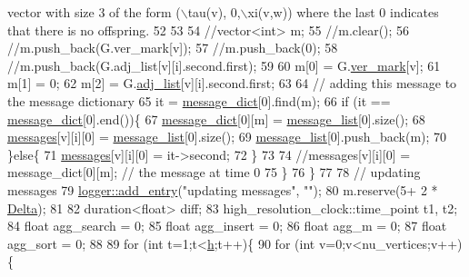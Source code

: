 \begin{DoxyCode}
{       vector with size 3 of the form (\(\backslash\)tau(v), 0,\(\backslash\)xi(v,w)) where the last 0 indicates that there is no offspring.}
52 
53 
54       \textcolor{comment}{//vector<int> m;}
55       \textcolor{comment}{//m.clear();}
56       \textcolor{comment}{//m.push\_back(G.ver\_mark[v]);}
57       \textcolor{comment}{//m.push\_back(0);}
58       \textcolor{comment}{//m.push\_back(G.adj\_list[v][i].second.first);}
59 
60       m[0] = G.\hyperlink{classmarked__graph_ac83e9377dd4d8bb95be1ac949b127296}{ver\_mark}[v];
61       m[1] = 0;
62       m[2] = G.\hyperlink{classmarked__graph_a1a0bf7ca413a278763f7c878b3b6fd6f}{adj\_list}[v][i].second.first;
63 
64       \textcolor{comment}{// adding this message to the message dictionary}
65       it = \hyperlink{classgraph__message_ab54d89b122c2b1322da0d5db2043fb84}{message\_dict}[0].find(m); 
66       \textcolor{keywordflow}{if} (it == \hyperlink{classgraph__message_ab54d89b122c2b1322da0d5db2043fb84}{message\_dict}[0].end())\{
67         \hyperlink{classgraph__message_ab54d89b122c2b1322da0d5db2043fb84}{message\_dict}[0][m] = \hyperlink{classgraph__message_aa17fdb629b423343edfafa97252763ef}{message\_list}[0].size();
68         \hyperlink{classgraph__message_aac77e098f0acf9650116a8e51fe3b4b7}{messages}[v][i][0] = \hyperlink{classgraph__message_aa17fdb629b423343edfafa97252763ef}{message\_list}[0].size();
69         \hyperlink{classgraph__message_aa17fdb629b423343edfafa97252763ef}{message\_list}[0].push\_back(m);
70       \}\textcolor{keywordflow}{else}\{
71         \hyperlink{classgraph__message_aac77e098f0acf9650116a8e51fe3b4b7}{messages}[v][i][0] = it->second;
72       \}
73 
74       \textcolor{comment}{//messages[v][i][0] = message\_dict[0][m]; // the message at time 0}
75     \}
76   \}
77 
78   \textcolor{comment}{// updating messages}
79   \hyperlink{classlogger_a710163deb17bc81f70d53d285b8ac9ac}{logger::add\_entry}(\textcolor{stringliteral}{"updating messages"}, \textcolor{stringliteral}{""});
80   m.reserve(5+ 2 * \hyperlink{classgraph__message_a45dfd061b7bc73572e5132fbf66efd55}{Delta});
81 
82   duration<float> diff;
83   high\_resolution\_clock::time\_point t1, t2; 
84   \textcolor{keywordtype}{float} agg\_search = 0;
85   \textcolor{keywordtype}{float} agg\_insert = 0;
86   \textcolor{keywordtype}{float} agg\_m = 0;
87   \textcolor{keywordtype}{float} agg\_sort = 0;
88 
89   \textcolor{keywordflow}{for} (\textcolor{keywordtype}{int} t=1;t<\hyperlink{classgraph__message_a934d63ed7275c211e13c6fb68824ed46}{h};t++)\{
90     \textcolor{keywordflow}{for} (\textcolor{keywordtype}{int} v=0;v<nu\_vertices;v++)\{

\end{DoxyCode}
